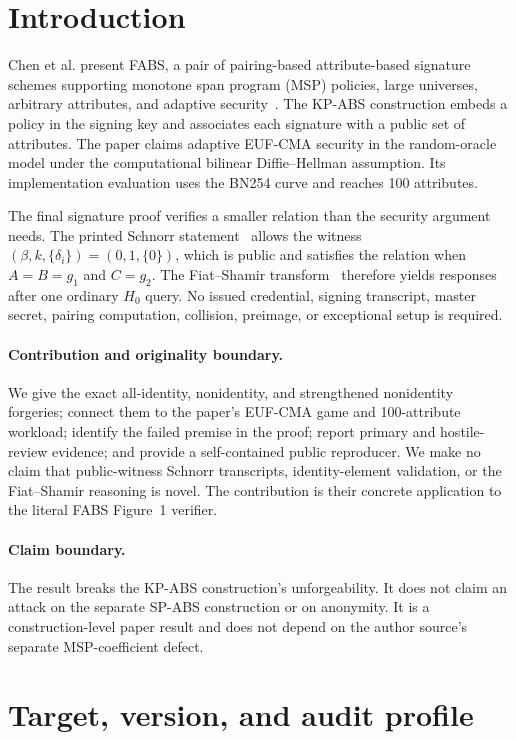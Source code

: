 \documentclass[10pt,a4paper]{article}
\begin{document}
\section{Introduction}

Chen et al. present FABS, a pair of pairing-based attribute-based signature
schemes supporting monotone span program (MSP) policies, large universes,
arbitrary attributes, and adaptive security~\cite{fabs}. The KP-ABS
construction embeds a policy in the signing key and associates each signature
with a public set of attributes. The paper claims adaptive EUF-CMA security in
the random-oracle model under the computational bilinear Diffie--Hellman
assumption. Its implementation evaluation uses the BN254 curve and reaches
100 attributes.

The final signature proof verifies a smaller relation than the security
argument needs. The printed Schnorr statement~\cite{schnorr} allows the witness
$(\beta,k,\{\delta_i\})=(0,1,\{0\})$, which is public and satisfies the
relation when $A=B=g_1$ and $C=g_2$. The Fiat--Shamir
transform~\cite{fiatshamir} therefore yields responses after one ordinary
$H_0$ query. No issued credential, signing
transcript, master secret, pairing computation, collision, preimage, or
exceptional setup is required.

\paragraph{Contribution and originality boundary.}
We give the exact all-identity, nonidentity, and strengthened nonidentity
forgeries; connect them to the paper's EUF-CMA game and 100-attribute workload;
identify the failed premise in the proof; report primary and hostile-review
evidence; and provide a self-contained public reproducer. We make no claim
that public-witness Schnorr transcripts, identity-element validation, or the
Fiat--Shamir reasoning is novel. The contribution is their concrete
application to the literal FABS Figure~1 verifier.

\paragraph{Claim boundary.}
The result breaks the KP-ABS construction's unforgeability. It does not claim
an attack on the separate SP-ABS construction or on anonymity. It is a
construction-level paper result and does not depend on the author source's
separate MSP-coefficient defect.

\section{Target, version, and audit profile}
\end{document}
